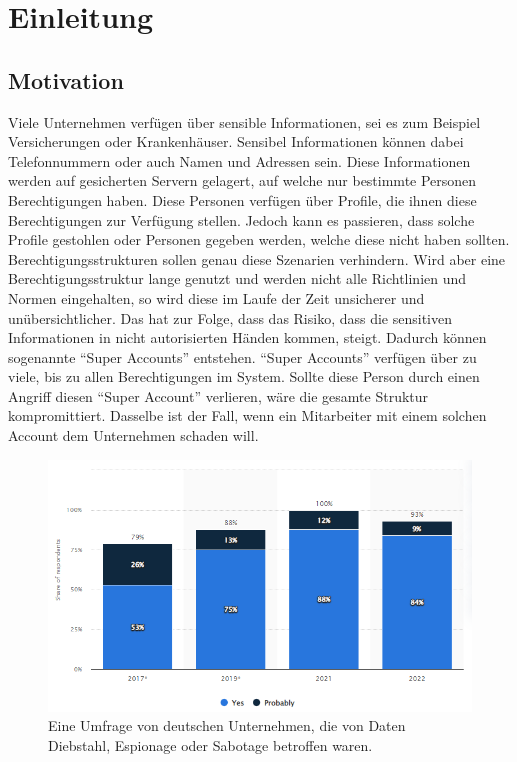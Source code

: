 \chapter{Einleitung}
\label{ch:intro}

\section{Motivation}
\label{sec:intro:motivation}
Viele Unternehmen verfügen über sensible Informationen, sei es zum Beispiel Versicherungen oder Krankenhäuser. Sensibel Informationen können dabei Telefonnummern oder auch Namen und Adressen sein.
Diese Informationen werden auf gesicherten Servern gelagert, auf welche nur bestimmte Personen Berechtigungen haben.
Diese Personen verfügen über Profile, die ihnen diese Berechtigungen zur Verfügung stellen.
Jedoch kann es passieren, dass solche Profile gestohlen oder Personen gegeben werden, welche diese nicht haben sollten.
Berechtigungsstrukturen sollen genau diese Szenarien verhindern.
Wird aber eine Berechtigungsstruktur lange genutzt und werden nicht alle Richtlinien und Normen eingehalten, so wird diese im Laufe der Zeit unsicherer und unübersichtlicher.
Das hat zur Folge, dass das Risiko, dass die sensitiven Informationen in nicht autorisierten Händen kommen, steigt.
Dadurch können sogenannte "`Super Accounts"' entstehen.
"`Super Accounts"' verfügen über zu viele, bis zu allen Berechtigungen im System.
Sollte diese Person durch einen Angriff diesen "`Super Account"' verlieren, wäre die gesamte Struktur kompromittiert.
Dasselbe ist der Fall, wenn ein Mitarbeiter mit einem solchen Account dem Unternehmen schaden will.

\begin{figure}[h!]
 \centering
 \includegraphics[width=1\textwidth]{gfx/Picture/Cyber_Crime.PNG}
 \caption{Eine Umfrage von deutschen Unternehmen, die von Daten Diebstahl, Espionage oder Sabotage betroffen waren. \cite{Stat22}}
 \label{fig:Crime}
\end{figure}

